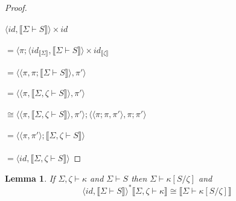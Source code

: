 \documentclass{article}
\newtheorem{lemma}{Lemma}
\newcommand{\sem}[1]{\llbracket #1 \rrbracket}
\begin{document}
\begin{proof}~\\~\\
$\langle \mathit{id}, \sem{\Sigma \vdash S} \rangle \times \mathit{id}$\\~\\
$= \langle \pi ; \langle \mathit{id}_{\sem{\Sigma}} , \sem{\Sigma \vdash S} \rangle \times \mathit{id}_{\sem{\zeta}}$\\~\\
$= \langle \langle \pi, \pi;\sem{\Sigma \vdash S} \rangle, \pi' \rangle$\\~\\
$= \langle \langle \pi, \sem{\Sigma,\zeta \vdash S} \rangle, \pi' \rangle$\\~\\
$\cong \langle \langle \pi, \sem{\Sigma,\zeta \vdash S} \rangle, \pi' \rangle; \langle \langle \pi;\pi,\pi' \rangle, \pi;\pi' \rangle$\\~\\
$= \langle \langle \pi, \pi' \rangle; \sem{\Sigma, \zeta \vdash S} \rangle $\\~\\
$= \langle \mathit{id}, \sem{\Sigma,\zeta \vdash S} \rangle$

\end{proof}

\begin{lemma}
If $\Sigma,\zeta \vdash \kappa$ and $\Sigma \vdash S$ then $\Sigma \vdash \kappa[S/\zeta]$ and $$\langle \mathit{id}, \sem{\Sigma \vdash S} \rangle^* \sem{\Sigma,\zeta \vdash \kappa} \cong \sem{\Sigma \vdash \kappa[S/\zeta]}$$ 
\end{lemma}
\end{document}

